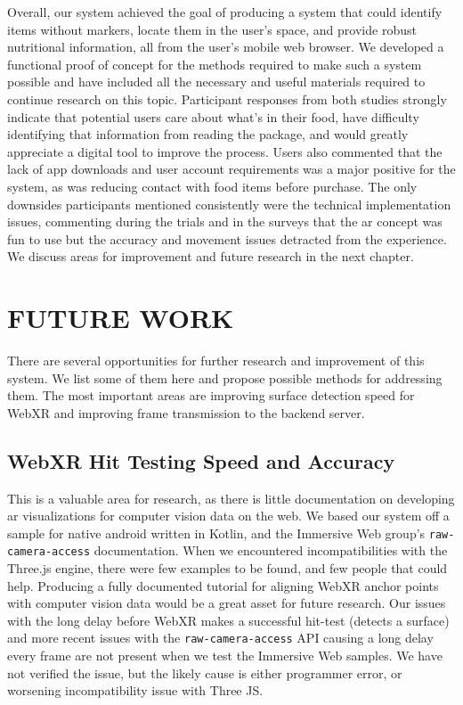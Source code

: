 \documentclass[thesis]{fputhesis}
\begin{document}
\begin{body}
Overall, our system achieved the goal of producing a system that could identify items without markers, locate them in the user's space, and provide robust nutritional information, all from the user's mobile web browser. We developed a functional proof of concept for the methods required to make such a system possible and have included all the necessary and useful materials required to continue research on this topic. Participant responses from both studies strongly indicate that potential users care about what's in their food, have difficulty identifying that information from reading the package, and would greatly appreciate a digital tool to improve the process. 
Users also commented that the lack of app downloads and user account requirements was a major positive for the system, as was reducing contact with food items before purchase. The only downsides participants mentioned consistently were the technical implementation issues, commenting during the trials and in the surveys that the \acrshort{ar} concept was fun to use but the accuracy and movement issues detracted from the experience. We discuss areas for improvement and future research in the next chapter.

\chapter{FUTURE WORK}
There are several opportunities for further research and improvement of this system. We list some of them here and propose possible methods for addressing them. The most important areas are improving surface detection speed for WebXR and improving frame transmission to the backend server.

\section{WebXR Hit Testing Speed and Accuracy}
This is a valuable area for research, as there is little documentation on developing \acrshort{ar} visualizations for computer vision data on the web. We based our system off a sample for native android written in Kotlin, and the Immersive Web group's \verb|raw-camera-access| documentation. When we encountered incompatibilities with the Three.js engine, there were few examples to be found, and few people that could help. Producing a fully documented tutorial for aligning WebXR anchor points with computer vision data would be a great asset for future research.
Our issues with the long delay before WebXR makes a successful hit-test (detects a surface) and more recent issues with the \verb|raw-camera-access| API causing a long delay every frame are not present when we test the Immersive Web samples. We have not verified the issue, but the likely cause is either programmer error, or worsening incompatibility issue with Three JS. 


\end{body}
\end{document}
